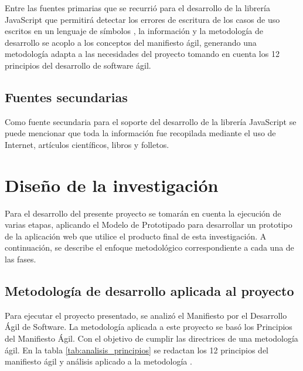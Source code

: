 Entre las fuentes primarias que se recurrió para el desarrollo de la librería JavaScript que permitirá detectar los errores de escritura de los casos de uso escritos en un lenguaje de símbolos , la información y la metodología de desarrollo se acoplo a los conceptos del manifiesto ágil, generando una metodología adapta a las necesidades del proyecto tomando en cuenta los 12 principios del desarrollo de software ágil.

\subsection{Fuentes secundarias}

Como fuente secundaria para el soporte del desarrollo de la librería JavaScript se puede mencionar que toda la información fue recopilada mediante el uso de Internet, artículos científicos, libros y folletos.

\section{Diseño de la investigación}

Para el desarrollo del presente proyecto se tomarán en cuenta la ejecución de varias etapas, aplicando el Modelo de Prototipado para desarrollar un prototipo de la aplicación web que utilice el producto final de esta investigación. A continuación, se describe el enfoque metodológico correspondiente a cada una de las fases. 

\subsection{Metodología de desarrollo aplicada al proyecto}

Para ejecutar el proyecto presentado, se analizó el Manifiesto por el Desarrollo Ágil de Software. La metodología aplicada a este proyecto se basó los Principios del Manifiesto Ágil. Con el objetivo de cumplir las directrices de una metodología ágil. En la tabla \ref{tab:analisis_principios} se redactan los 12 principios del manifiesto ágil y análisis aplicado a la metodología \cite{managil}.

